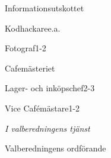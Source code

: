 \documentclass[../_main/handlingar.tex]{subfiles}
\begin{document}

\begin{valforslagslista}
    \begin{utskott}{Informationsutskottet}
        \begin{post}{Kodhackare}{e.a.}
        \end{post}
        \begin{post}{Fotograf}{1-2}
        \end{post}
    \end{utskott}
    \begin{utskott}{Cafemästeriet}
        \begin{post}{Lager- och inköpschef}{2-3}
        \end{post}
        \begin{post}{Vice Cafémästare}{1-2}
        \end{post}
    \end{utskott}
\end{valforslagslista}

\begin{signatures}{1}
\emph{I valberedningens tjänst}
\signature{Elin Magnusson}{Valberedningens ordförande}
\end{signatures}
\end{document}
